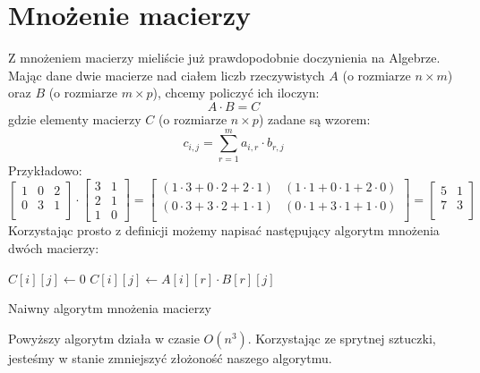 \section{Mnożenie macierzy}

Z mnożeniem macierzy mieliście już prawdopodobnie doczynienia na Algebrze.
Mając dane dwie macierze nad ciałem liczb rzeczywistych $A$ (o rozmiarze $n \times m$) oraz $B$ (o rozmiarze $m \times p$), chcemy policzyć ich iloczyn:
\[
 A \cdot B = C
\]
gdzie elementy macierzy $C$ (o rozmiarze $n \times p$) zadane są wzorem:
\[
 c_{i,j} = \sum_{r=1}^{m} a_{i,r} \cdot b_{r,j}
\]
Przykładowo:
\[
  \begin{bmatrix}
    1 & 0 & 2 \\
    0 & 3 & 1 \\
  \end{bmatrix}
\cdot
  \begin{bmatrix}
    3 & 1 \\
    2 & 1 \\
    1 & 0
  \end{bmatrix}
=
  \begin{bmatrix}
     (1 \cdot 3  +  0 \cdot 2  +  2 \cdot 1) & (1 \cdot 1   +   0 \cdot 1   +   2 \cdot 0) \\
     (0 \cdot 3  +  3 \cdot 2  +  1 \cdot 1) & (0 \cdot 1   +   3 \cdot 1   +   1 \cdot 0) \\
  \end{bmatrix}
=
  \begin{bmatrix}
    5 & 1 \\
    7 & 3 \\
  \end{bmatrix}
\]
Korzystając prosto z definicji możemy napisać następujący algorytm mnożenia dwóch macierzy:

\begin{algorithm}[H]
  \DontPrintSemicolon
  
  
  
  {
     {
	$C[i][j] \leftarrow 0$\;
	{
	  $C[i][j] \leftarrow A[i][r] \cdot B[r][j]$\;
	}
     }
  }
  
  \caption{Naiwny algorytm mnożenia macierzy}
  \label{alg-mnozenie-macierzy}
\end{algorithm}
Powyższy algorytm działa w czasie $O(n^3)$.
Korzystając ze sprytnej sztuczki, jesteśmy w stanie zmniejszyć złożoność naszego algorytmu.

